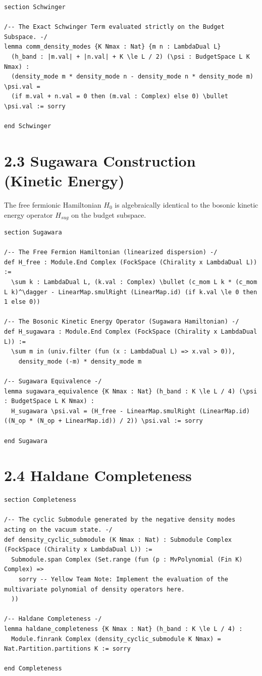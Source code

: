 \documentclass[12pt]{article}
\begin{document}
\begin{lstlisting}[language=lean]
section Schwinger

/-- The Exact Schwinger Term evaluated strictly on the Budget Subspace. -/
lemma comm_density_modes {K Nmax : Nat} {m n : LambdaDual L} 
  (h_band : |m.val| + |n.val| + K \le L / 2) (\psi : BudgetSpace L K Nmax) :
  (density_mode m * density_mode n - density_mode n * density_mode m) \psi.val =
  (if m.val + n.val = 0 then (m.val : Complex) else 0) \bullet \psi.val := sorry

end Schwinger
\end{lstlisting}

\section{2.3 Sugawara Construction (Kinetic Energy)}
The free fermionic Hamiltonian $H_0$ is algebraically identical to the bosonic kinetic energy operator $H_{sug}$ on the budget subspace.

\begin{lstlisting}[language=lean]
section Sugawara

/-- The Free Fermion Hamiltonian (linearized dispersion) -/
def H_free : Module.End Complex (FockSpace (Chirality x LambdaDual L)) :=
  \sum k : LambdaDual L, (k.val : Complex) \bullet (c_mom L k * (c_mom L k)^\dagger - LinearMap.smulRight (LinearMap.id) (if k.val \le 0 then 1 else 0))

/-- The Bosonic Kinetic Energy Operator (Sugawara Hamiltonian) -/
def H_sugawara : Module.End Complex (FockSpace (Chirality x LambdaDual L)) :=
  \sum m in (univ.filter (fun (x : LambdaDual L) => x.val > 0)), 
    density_mode (-m) * density_mode m

/-- Sugawara Equivalence -/
lemma sugawara_equivalence {K Nmax : Nat} (h_band : K \le L / 4) (\psi : BudgetSpace L K Nmax) :
  H_sugawara \psi.val = (H_free - LinearMap.smulRight (LinearMap.id) ((N_op * (N_op + LinearMap.id)) / 2)) \psi.val := sorry

end Sugawara
\end{lstlisting}

\section{2.4 Haldane Completeness}
\begin{lstlisting}[language=lean]
section Completeness

/-- The cyclic Submodule generated by the negative density modes acting on the vacuum state. -/
def density_cyclic_submodule (K Nmax : Nat) : Submodule Complex (FockSpace (Chirality x LambdaDual L)) :=
  Submodule.span Complex (Set.range (fun (p : MvPolynomial (Fin K) Complex) => 
    sorry -- Yellow Team Note: Implement the evaluation of the multivariate polynomial of density operators here.
  ))

/-- Haldane Completeness -/
lemma haldane_completeness {K Nmax : Nat} (h_band : K \le L / 4) :
  Module.finrank Complex (density_cyclic_submodule K Nmax) = Nat.Partition.partitions K := sorry

end Completeness
\end{lstlisting}
\end{document}
